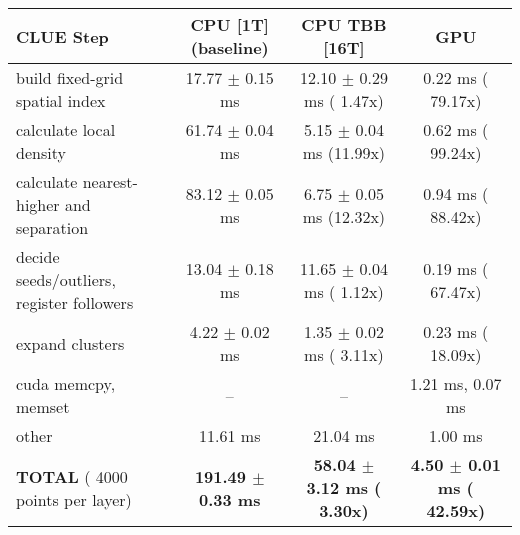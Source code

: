     \begin{tabular}{l|c|c|c}
    \hline
    CLUE Step                                 & CPU [1T] (baseline)         & CPU TBB [16T]                         & GPU                       \\ \hline
    build fixed-grid spatial index            &  17.77 $\pm$  0.15 ms       &  12.10 $\pm$  0.29 ms ( 1.47x)        &   0.22 ms ( 79.17x)       \\
    calculate local density                   &  61.74 $\pm$  0.04 ms       &   5.15 $\pm$  0.04 ms (11.99x)        &   0.62 ms ( 99.24x)       \\
    calculate nearest-higher and separation   &  83.12 $\pm$  0.05 ms       &   6.75 $\pm$  0.05 ms (12.32x)        &   0.94 ms ( 88.42x)       \\
    decide seeds/outliers, register followers &  13.04 $\pm$  0.18 ms       &  11.65 $\pm$  0.04 ms ( 1.12x)        &   0.19 ms ( 67.47x)       \\
    expand clusters                           &   4.22 $\pm$  0.02 ms       &   1.35 $\pm$  0.02 ms ( 3.11x)        &   0.23 ms ( 18.09x)       \\ \hline
    cuda memcpy, memset                       & --                          & --                                    &   1.21 ms,   0.07 ms      \\ 
    other                                     &  11.61 ms                   &  21.04 ms                             &   1.00 ms                 \\ \hline
    \textbf{TOTAL} ( 4000 points per layer)   & \textbf{191.49 $\pm$  0.33 ms} & \textbf{ 58.04 $\pm$  3.12 ms ( 3.30x)} & \textbf{  4.50 $\pm$  0.01 ms ( 42.59x)}  \\
    \hline 
    \end{tabular}
    \linebreak


